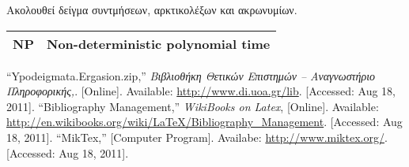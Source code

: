 \documentclass{dithesis}
\begin{document}
\begin{thesisabbreviations}
Ακολουθεί δείγμα συντμήσεων, αρκτικολέξων και ακρωνυμίων.

\begin{tabularx}{\textwidth}{|X|X|}
  \hline
  NP & Non-deterministic polynomial time \\
  \hline
\end{tabularx}

\end{thesisabbreviations}

\begin{thesisbibliography}[Αναφορές]{99}
  ``Ypodeigmata.Ergasion.zip,''
  \textit{Βιβλιοθήκη Θετικών Επιστημών -- Αναγνωστήριο Πληροφορικής,}.
  [Online].
  Available: \url{http://www.di.uoa.gr/lib}.
  [Accessed: Aug 18, 2011].
  ``Bibliography Management,''
  \textit{WikiBooks on Latex},
  [Online].
  Available: \url{http://en.wikibooks.org/wiki/LaTeX/Bibliography_Management}.
  [Accessed: Aug 18, 2011].
  ``MikTex,''
  [Computer Program]. Availabe: \url{http://www.miktex.org/}.
  [Accessed: Aug 18, 2011].
\end{thesisbibliography}
\end{document}
